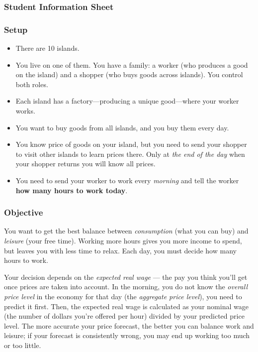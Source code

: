 \documentclass[a4paper,11pt]{article}%
\begin{document}
\begin{mdframed}[linewidth=1pt,roundcorner=5pt,backgroundcolor=gray!5]
\subsubsection*{Student Information Sheet}

\subsubsection*{Setup}
\begin{itemize}
  \item There are 10 islands. 
  \item You live on one of them. You have a family: a worker (who produces a good on the island) and a shopper (who buys goods across islands). You control both roles.
  \item Each island has a factory---producing a unique good---where your worker works.
  \item You want to buy goods from all islands, and you buy them every day.
  \item You know price of goods on your island, but you need to send your
shopper to visit other islands to learn prices there. Only at \textit{the
end of the day} when your shopper returns you will know all prices.
  \item You need to send your worker to work every \textit{morning} and tell
the worker \textbf{how many hours to work today}. 
\end{itemize}

\subsubsection*{Objective}

You want to get the best balance between \emph{consumption} (what you can buy) and \emph{leisure} (your free time). Working more hours gives you more income to spend, but leaves you with less time to relax. Each day, you must decide how many hours to work.
\bigskip

Your decision depends on the \emph{expected real wage} — the pay you think you’ll get once prices are taken into account. In the morning, you do not know the \emph{overall price level} in the economy for that day (the \emph{aggregate price level}), you need to predict it first. Then, the expected real wage is calculated as your nominal wage (the number of dollars you’re offered per hour) divided by your predicted price level. The more accurate your price forecast, the better you can balance work and leisure; if your forecast is consistently wrong, you may end up working too much or too little.


\end{mdframed}
\end{document}
